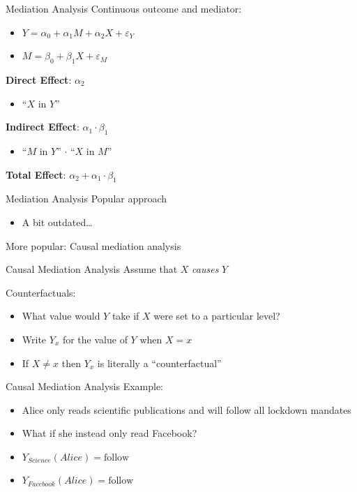 \documentclass[14pt]{beamer}
\begin{document}
\begin{frame}{Mediation Analysis}
    Continuous outcome and mediator:
    \begin{itemize}
        \item $Y = \alpha_0 + \alpha_1 M + \alpha_2 X + \varepsilon_Y$
        \item $M = \beta_0 + \beta_1 X + \varepsilon_M$ \newline
    \end{itemize}

    
    \textbf{Direct Effect}: $\alpha_2$
    \begin{itemize}
        \item ``$X$ in $Y$''
    \end{itemize}
    \textbf{Indirect Effect}: $\alpha_1 \cdot \beta_1$
    \begin{itemize}
        \item ``$M$ in $Y$'' $\cdot$ ``$X$ in $M$''
    \end{itemize}
    \textbf{Total Effect}: $\alpha_2 + \alpha_1 \cdot \beta_1$

\end{frame}

\begin{frame}{Mediation Analysis}
    Popular approach
    \begin{itemize}
        \item A bit outdated\ldots \newline
    \end{itemize}

    More popular: Causal mediation analysis
    
\end{frame}

\begin{frame}{Causal Mediation Analysis}
    Assume that $X$ \textit{causes} $Y$\newline

    Counterfactuals:
    \begin{itemize}
        \item What value would $Y$ take if $X$ were set to a particular level?
        \item Write $Y_x$ for the value of $Y$ when $X=x$
        \item If $X\neq x$ then $Y_x$ is literally a ``counterfactual'' 
    \end{itemize}
\end{frame}

\begin{frame}{Causal Mediation Analysis}
    Example:
    \begin{itemize}
        \item Alice only reads scientific publications and will follow all lockdown mandates
        \item What if she instead only read Facebook?\newline
        \item $Y_{Science}(Alice) = \mathrm{follow}$
        \item $Y_{Facebook}(Alice) = \mathrm{follow}$
    \end{itemize}
\end{frame}
\end{document}
